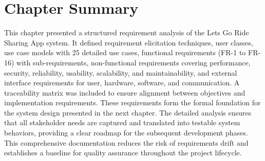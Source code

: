 
\section*{Chapter Summary}

This chapter presented a structured requirement analysis of the Lets Go Ride Sharing App system. It defined requirement elicitation techniques, user classes, use case models with 25 detailed use cases, functional requirements (FR-1 to FR-16) with sub-requirements, non-functional requirements covering performance, security, reliability, usability, scalability, and maintainability, and external interface requirements for user, hardware, software, and communication. A traceability matrix was included to ensure alignment between objectives and implementation requirements. These requirements form the formal foundation for the system design presented in the next chapter. The detailed analysis ensures that all stakeholder needs are captured and translated into testable system behaviors, providing a clear roadmap for the subsequent development phases. This comprehensive documentation reduces the risk of requirements drift and establishes a baseline for quality assurance throughout the project lifecycle.

